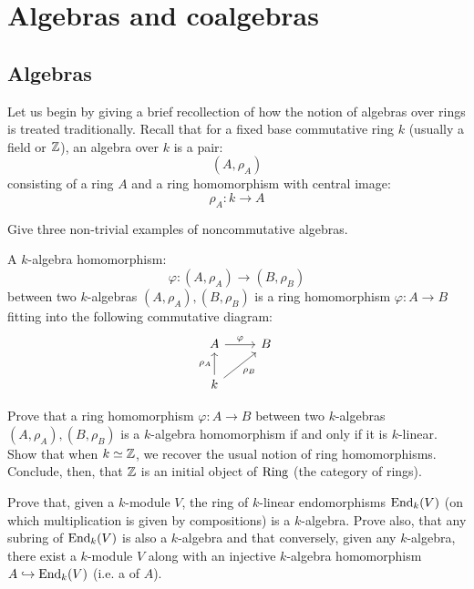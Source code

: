 \section{Algebras and coalgebras}
    \subsection{Algebras}
        Let us begin by giving a brief recollection of how the notion of algebras over rings is treated traditionally. Recall that for a fixed base commutative ring $k$ (usually a field or $\mathbb{Z}$), an algebra over $k$ is a pair:
            $$(A, \rho_A)$$
        consisting of a ring $A$ and a ring homomorphism with central image:
            $$\rho_A: k \to A$$
        \begin{question}
            Give three non-trivial examples of noncommutative algebras.
        \end{question}
        A $k$-algebra homomorphism:
            $$\varphi: (A, \rho_A) \to (B, \rho_B)$$
        between two $k$-algebras $(A, \rho_A), (B, \rho_B)$ is a ring homomorphism $\varphi: A \to B$ fitting into the following commutative diagram:
            $$
                \begin{tikzcd}
            	A & B \\
            	k
            	\arrow["\varphi", from=1-1, to=1-2]
            	\arrow["{\rho_A}", from=2-1, to=1-1]
            	\arrow["{\rho_B}"', from=2-1, to=1-2]
                \end{tikzcd}
            $$
        \begin{question}
            Prove that a ring homomorphism $\varphi: A \to B$ between two $k$-algebras $(A, \rho_A), (B, \rho_B)$ is a $k$-algebra homomorphism if and only if it is $k$-linear. Show that when $k \simeq \mathbb{Z}$, we recover the usual notion of ring homomorphisms. Conclude, then, that $\mathbb{Z}$ is an initial object of $\mathrm{Ring}$ (the category of rings).
        \end{question}
        \begin{question}
            Prove that, given a $k$-module $V$, the ring of $k$-linear endomorphisms $\mathrm{End}_k(V)$ (on which multiplication is given by compositions) is a $k$-algebra. Prove also, that any subring of $\mathrm{End}_k(V)$ is also a $k$-algebra and that conversely, given any $k$-algebra, there exist a $k$-module $V$ along with an injective $k$-algebra homomorphism $A \hookrightarrow \mathrm{End}_k(V)$ (i.e. a  of $A$). 
        \end{question}
